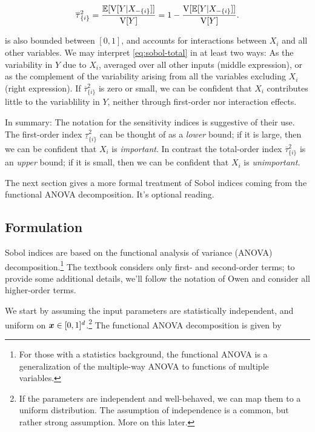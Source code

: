 \documentclass[../primer.tex]{subfiles}
\begin{document}
\begin{equation}\label{eq:sobol-total}
  \overline{\tau}_{\{i\}}^2 = \frac{\E[\V[Y|X_{-\{i\}}]]}{\V[Y]} = %
  1 - \frac{\V[\E[Y|X_{-\{i\}}]]}{\V[Y]}.
\end{equation}

\noindent {} is also bounded between \([0,1]\), and accounts
for interactions between \(X_i\) and all other variables. We may interpret
\eqref{eq:sobol-total} in at least two ways: As the variability in \(Y\) due to
\(X_i\), averaged over all other inputs (middle expression), or as the complement
of the variability arising from all the variables excluding \(X_i\) (right
expression). If \(\overline{\tau}_{\{i\}}^2\) is zero or small, we can be
confident that \(X_i\) contributes little to the variablility in \(Y\), neither
through first-order nor interaction effects.

In summary: The notation for the sensitivity indices is suggestive of their use.
The first-order index \(\underline{\tau}_{\{i\}}^2\) can be thought of as a
\emph{lower} bound; if it is large, then we can be confident that \(X_i\) is
\emph{important}. In contrast the total-order index \(\overline{\tau}_{\{i\}}^2\) is an
\emph{upper} bound; if it is small, then we can be confident that \(X_i\) is
\emph{unimportant}.

The next section gives a more formal treatment of Sobol indices coming from the
functional ANOVA decomposition. It's optional reading.

\subsection{Formulation}
\label{sec:org4f0f02c}
Sobol indices are based on the functional analysis of variance (ANOVA)
decomposition.\footnote{For those with a statistics background, the functional ANOVA
is a generalization of the multiple-way ANOVA to functions of multiple
variables.} The textbook considers only first- and second-order terms; to
provide some additional details, we'll follow the notation of Owen
\cite{owen2013variance} and consider all higher-order terms.

We start by assuming the input parameters are statistically independent, and
uniform on \(\boldsymbol{x}\in[0,1]^d\).\footnote{If the parameters are independent and
well-behaved, we can map them to a uniform distribution. The assumption of
independence is a common, but rather strong assumption. More on this later.} The
functional ANOVA decomposition is given by
\end{document}
